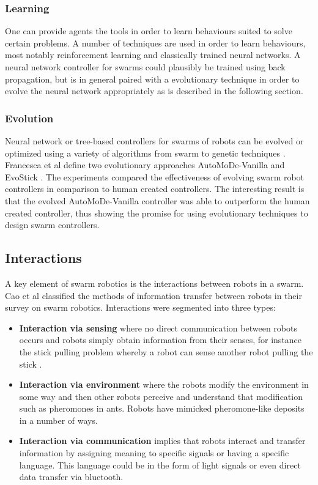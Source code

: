 \subsubsection{Learning}

One can provide agents the tools in order to learn behaviours suited to solve certain problems. A number of techniques are used in order to learn behaviours, most notably reinforcement learning and classically trained neural networks. A neural network controller for swarms could plausibly be trained using back propagation, but is in general paired with a evolutionary technique in order to evolve the neural network appropriately as is described in the following section. 

\subsubsection{Evolution}
Neural network or tree-based controllers for swarms of robots can be evolved or optimized using a variety of algorithms from swarm to genetic techniques \cite{baldassarre2003evolving, tuci2014evolutionary}. Francesca et al define two evolutionary approaches AutoMoDe-Vanilla and EvoStick \cite{francesca2014automode,francesca2014experiment}. The experiments compared the effectiveness of evolving swarm robot controllers in comparison to human created controllers. The interesting result is that the evolved AutoMoDe-Vanilla controller was able to outperform the human created controller, thus showing the promise for using evolutionary techniques to design swarm controllers.

\subsection{Interactions}
A key element of swarm robotics is the interactions between robots in a swarm. Cao et al \cite{cao1997cooperative} classified the methods of information transfer between robots in their  survey on swarm robotics. Interactions were segmented into three types:
\begin{itemize}
	\item \textbf{Interaction via sensing} where no direct communication between robots occurs and robots simply obtain information from their senses, for instance the stick pulling problem whereby a robot can sense another robot pulling the stick \cite{ijspeert2001collaboration}. 
	\item \textbf{Interaction via environment} where the robots modify the environment in some way and then other robots perceive and understand that modification such as pheromones in ants. Robots have mimicked pheromone-like deposits in a number of ways.
	\item \textbf{Interaction via communication} implies that robots interact and transfer information by assigning meaning to specific signals or having a specific language. This language could be in the form of light signals or even direct data transfer via bluetooth.  
\end{itemize}

